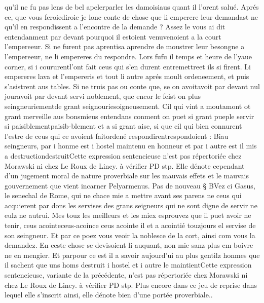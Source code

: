 \documentclass{article}
\begin{document}
\begin{pages}
   qu’il ne fu pas lens de bel 
   apelerparler 
   les damoisiaus quant il l’orent salué. \pend
\pstart Aprés ce, que vous 
   feroiediroie je lonc conte 
   de chose que li emperere leur demandast ne qu’il 
   en respondissent 
   a l’encontre de la demande ? 
   Assez le vous ai dit entendanment par devant pourquoi 
   il estoient venuvenoient 
   a la court l’empereeur. 
   Si ne furent pas aprentisa aprendre de moustrer leur besongne a 
      l’empereeur, ne li empereres du respondre. Lors 
   fufu il temps et heure de l’yaue corner, 
   si i coururentl'ont fait 
      ceus qui s’en durent entremettreet ils si firent. 
   Li empereres lava et 
   l’empereris et 
   tout li autre aprés moult ordeneement, et puis s’asistrent aus tables. 
   Si ne truis pas ou conte que, se on 
   avoitavoit par devant nul jouravoit par devant servi noblement, 
   que encor le feist on plus 
   seingneuriementde grant seignouriesoigneusement. 
   Cil qui vint a moutamont ot grant merveille aus 
   bonsmieus entendans conment on puet si grant pueple servir si 
   paisiblementpaisib-blement et a si grant aise, 
   si que cil qui bien connurent l'estre de ceus qui ce avoient faitordené 
   respondirentrespondoient :
      Biau seingneurs, par i honme est i hostel maintenu 
         en honneur et par i autre est il 
         mis a destructiondestruitCette 
            expression sentencieuse n'est pas répertoriée chez Morawski ni chez Le Roux de Lincy. à vérifier PD stp. Elle dénote
         cependant d'un jugement moral de nature proverbiale sur les mauvais effets et le mauvais gouvernement que vient incarner
         Pelyarmenus. \pend
\pstart Pas de nouveau § BVez ci Gasus, le senechal de 
   Rome, qui ne chace mie a mettre avant ses parens 
   ne ceus qui acquierent par dons les servises des grans seigneurs qui ne sont digne de servir ne eulz ne autrui. 
   Mes touz les meilleurs et les miex esprouvez que il puet avoir ne tenir, 
   ceus acointeceus-acoince ceus acointe
   il et a acointié touzjours el servise de 
   son seingneur. 
   Et par ce poez vous veoir la noblesce de la cort, ainsi com vous la demandez. 
   En ceste chose se devisoient li auquant, non mie sanz plus em boivre ne en mengier. 
   Et parpour ce est il a savoir aujourd’ui au plus gentilz honmes que il sachent 
   que uns homs destruit i hostel et i autre le maintientCette 
      expression sentencieuse, variante de la précédente, n'est pas répertoriée chez Morawski ni chez Le Roux de Lincy. à vérifier PD stp. 
      Plus encore dans ce jeu de reprise dans lequel elle s'inscrit ainsi, elle dénote bien d'une portée proverbiale.. 

\end{pages}
\end{document}
